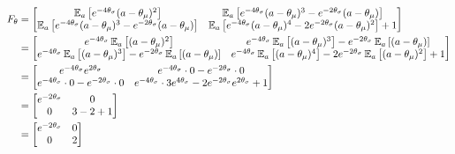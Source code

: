 \documentclass{exam}
\begin{document}
\begin{enumerate}
\begin{solutionorlines}[2in]
            \begin{align*}
                F_{\theta} &= \begin{bmatrix}
                \operatorname*{\mathbb{E}}_a{\left[e^{-4\theta_\sigma}(a - \theta_{\mu})^2\right]} & \operatorname*{\mathbb{E}}_a{\left[e^{-4\theta_\sigma}(a - \theta_{\mu})^3 - e^{-2\theta_\sigma}(a - \theta_{\mu})\right]} \\
                \operatorname*{\mathbb{E}}_a{\left[e^{-4\theta_\sigma}(a - \theta_{\mu})^3 - e^{-2\theta_\sigma}(a - \theta_{\mu})\right]}   & \operatorname*{\mathbb{E}}_a{\left[e^{-4\theta_\sigma}(a - \theta_{\mu})^4 -2 e^{-2\theta_\sigma}(a - \theta_{\mu})^2\right]} +1
                \end{bmatrix}\\
                &=\begin{bmatrix}
                e^{-4\theta_\sigma} \operatorname*{\mathbb{E}}_a{\left[(a - \theta_{\mu})^2\right]} & e^{-4\theta_\sigma} \operatorname*{\mathbb{E}}_a{\left[(a - \theta_{\mu})^3\right]} - e^{-2\theta_\sigma} \operatorname*{\mathbb{E}}_a{\left[(a - \theta_{\mu})\right]} \\
                e^{-4\theta_\sigma}\operatorname*{\mathbb{E}}_a{\left[(a - \theta_{\mu})^3\right]} - e^{-2\theta_\sigma}\operatorname*{\mathbb{E}}_a{\left[(a - \theta_{\mu})\right]}   & e^{-4\theta_\sigma}\operatorname*{\mathbb{E}}_a{\left[(a - \theta_{\mu})^4\right]} -2 e^{-2\theta_\sigma}\operatorname*{\mathbb{E}}_a{\left[(a - \theta_{\mu})^2\right]} + 1
                \end{bmatrix}\\
                &=\begin{bmatrix}
                e^{-4\theta_\sigma} e^{2\theta_{\sigma}} & e^{-4\theta_\sigma} \cdot 0 - e^{-2\theta_\sigma} \cdot 0 \\
                e^{-4\theta_\sigma} \cdot 0 - e^{-2\theta_\sigma} \cdot 0  & e^{-4\theta_\sigma} \cdot 3 e^{4\theta_{\sigma}} -2 e^{-2\theta_\sigma}e^{2\theta_{\sigma}} +1
                \end{bmatrix}\\
                &=\begin{bmatrix}
                e^{-2\theta_\sigma}  & 0\\
                0  & 3 - 2  + 1
                \end{bmatrix}\\
                &=\begin{bmatrix}
                e^{-2\theta_\sigma}  & 0\\
                0  & 2
                \end{bmatrix}
            \end{align*}
            

\end{solutionorlines}
\end{enumerate}
\end{document}
